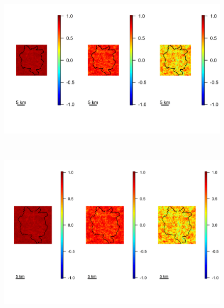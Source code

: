 \documentclass[12pt,a4paper]{report}
\begin{document}
\begin{figure}[H]
\begin{center}
\includegraphics[width = \linewidth, height = 80mm]{Autocorrelations in the Latent Field - Major 2.png}
\end{center}
\end{figure}

\begin{figure}[H]
\begin{center}
\includegraphics[width = \linewidth, height = 80mm]{Autocorrelations in the Latent Field - Major 13456.png}
\end{center}
\end{figure}
\end{document}
